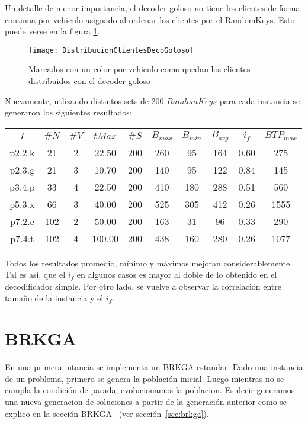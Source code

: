 \bigskip

Un detalle de menor importancia, el decoder goloso no tiene los clientes de forma continua por vehiculo asignado al ordenar los clientes por el RandomKeys. Esto puede verse en la figura \ref{fig:DistribucionClientesDecoGoloso}.

\begin{figure}[h]
	\caption{Marcados con un color por vehiculo como quedan los clientes distribuidos con el decoder goloso}
	\centering
	\texttt{[image: DistribucionClientesDecoGoloso]}
	\label{fig:DistribucionClientesDecoGoloso}
\end{figure}

\bigskip

Nuevamente, utlizando distintos sets de 200 $RandomKeys$ para cada instancia se generaron los siguientes resultados:

\begin{center}
\begin{tabular}{ |c|c|c|c|c|c|c|c|c|c| } 
\hline
$I$ & $\#N$ & $\#V$ & $tMax$ & $\#S$ & $B_{max}$ & $B_{min}$ & $B_{avg}$ & $i_{f}$ & $BTP_{max}$ \\
\hline
p2.2.k & 21 & 2 & 22.50 & 200 & 260 & 95 & 164 & 0.60 & 275   \\
p2.3.g & 21 & 3 & 10.70 & 200 & 140 & 95 & 122 & 0.84 & 145   \\
p3.4.p & 33 & 4 & 22.50 & 200 & 410 & 180 & 288 & 0.51 & 560   \\
p5.3.x & 66 & 3 & 40.00 & 200 & 525 & 305 & 412 & 0.26 & 1555   \\
p7.2.e & 102 & 2 & 50.00 & 200 & 163 & 31 & 96 & 0.33 & 290   \\
p7.4.t & 102 & 4 & 100.00 & 200 & 438 & 160 & 280 & 0.26 & 1077   \\
\hline
\end{tabular}
\end{center}

Todos los resultados promedio, mínimo y máximos mejoran considerablemente. Tal es así, que el $i_{f}$ en algunos casos es mayor al doble de lo obtenido en el decodificador simple. Por otro lado, se vuelve a observar la correlación entre tamaño de la instancia y el $i_{f}$.

\section{BRKGA}

En una primera intancia se implementa un BRKGA estandar. Dado una instancia de un problema, primero se genera la población inicial. Luego mientras no se cumpla la condición de parada, evolucionamos la poblacion. Es decir generamos una nueva generacion de soluciones a partir de la generación anterior como se explico en la sección BRKGA ~(ver sección~\ref{sec:brkga}).

